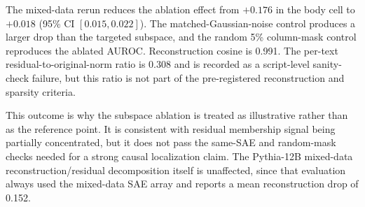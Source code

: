 The mixed-data rerun reduces the ablation effect from $+0.176$ in the body cell to $+0.018$ (95\% CI $[0.015, 0.022]$). The matched-Gaussian-noise control produces a larger drop than the targeted subspace, and the random 5\% column-mask control reproduces the ablated AUROC. Reconstruction cosine is 0.991. The per-text residual-to-original-norm ratio is 0.308 and is recorded as a script-level sanity-check failure, but this ratio is not part of the pre-registered reconstruction and sparsity criteria.

This outcome is why the subspace ablation is treated as illustrative rather than as the reference point. It is consistent with residual membership signal being partially concentrated, but it does not pass the same-SAE and random-mask checks needed for a strong causal localization claim. The Pythia-12B mixed-data reconstruction/residual decomposition itself is unaffected, since that evaluation always used the mixed-data SAE array and reports a mean reconstruction drop of 0.152.

\begin{table}[!htbp]
\centering
\caption{Top-$K$ residual principal-component ablation on the four models that pass the reconstruction-quality criterion, at $K=10$ with $K=5$ as a sparser-support control.
The drop is the paired difference between the unablated and ablated probe AUROC, with bootstrap 95\% CI from 10000 resamples.
The pre-registered decisive criterion, where the primary intervention beats both random-rotation and matched-Gaussian noise controls at the 95\% bootstrap margin, is met on zero of the six cells.
Pythia-12B is the only model where $K=10$ produces a substantial subspace-level drop. The remaining cells sit at the floor.}
\label{tab:kpc_kten_cells}
\end{table}

